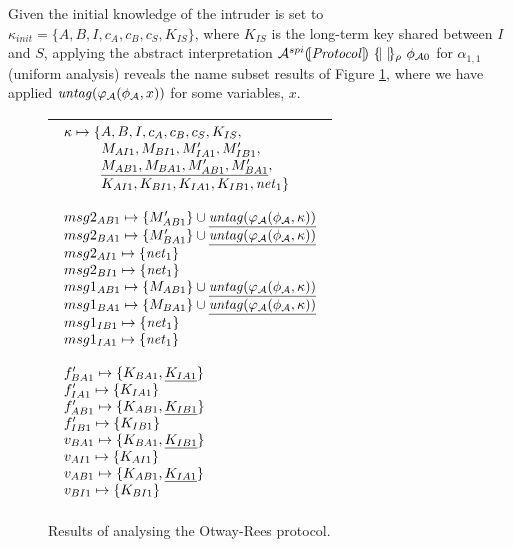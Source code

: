\documentclass[10pt,a4paper,final,oneside,fleqn]{book}
\begin{document}
Given the initial knowledge of the intruder is set to $\kappa_{init}=\{A,B,I,c_A,c_B,c_S,K_{IS}\}$, where $K_{IS}$ is the long-term key shared between $I$ and $S$, applying the abstract interpretation $\mathcal{A}^{spi}(\![\mbox{{\itshape Protocol\/}}]\!)~\{\!|~|\!\}_\rho~\phi_{\mathcal{A}0}$ for $\alpha_{1,1}$ (uniform analysis) reveals the name subset results of Figure \ref{anot}, where we have applied $\mbox{{\itshape untag\/}}(\varphi_\mathcal{A}(\phi_\mathcal{A},x))$ for some variables, $x$.
\begin{figure}[bht]
\begin{center}
\begin{tabular}{|l|}
\hline
$\begin{array}{l}
\kappa\mapsto\{A,B,I,c_A,c_B,c_S,K_{IS},\\
~~~~~~~~M_{AI1},M_{BI1},M'_{IA1},M'_{IB1},\\
~~~~~~~~\underline{M_{AB1},M_{BA1},M'_{AB1},M'_{BA1}},\\
~~~~~~~~K_{AI1},K_{BI1},K_{IA1},K_{IB1},\mbox{{\itshape net\/}}_1\}\\\\
msg2_{AB1}\mapsto\{M'_{AB1}\}\cup\underline{\mbox{{\itshape untag\/}}(\varphi_\mathcal{A}(\phi_\mathcal{A},\kappa))}\\
msg2_{BA1}\mapsto\{M'_{BA1}\}\cup\underline{\mbox{{\itshape untag\/}}(\varphi_\mathcal{A}(\phi_\mathcal{A},\kappa))}\\
msg2_{AI1}\mapsto\{\mbox{{\itshape net\/}}_1\}\\
msg2_{BI1}\mapsto\{\mbox{{\itshape net\/}}_1\}\\
msg1_{AB1}\mapsto\{M_{AB1}\}\cup\underline{\mbox{{\itshape untag\/}}(\varphi_\mathcal{A}(\phi_\mathcal{A},\kappa))}\\
msg1_{BA1}\mapsto\{M_{BA1}\}\cup\underline{\mbox{{\itshape untag\/}}(\varphi_\mathcal{A}(\phi_\mathcal{A},\kappa))}\\
msg1_{IB1}\mapsto\{\mbox{{\itshape net\/}}_1\}\\
msg1_{IA1}\mapsto\{\mbox{{\itshape net\/}}_1\}\\\\
f'_{BA1}\mapsto\{K_{BA1},\underline{K_{IA1}}\}\\
f'_{IA1}\mapsto\{K_{IA1}\}\\
f'_{AB1}\mapsto\{K_{AB1},\underline{K_{IB1}}\} \\
f'_{IB1}\mapsto\{K_{IB1}\}\\
v_{BA1}\mapsto\{K_{BA1},\underline{K_{IB1}}\}\\
v_{AI1}\mapsto\{K_{AI1}\}\\
v_{AB1}\mapsto\{K_{AB1},\underline{K_{IA1}}\}\\
v_{BI1}\mapsto\{K_{BI1}\}
\end{array}$\\
\hline
\end{tabular}
\end{center}
\caption{Results of analysing the Otway-Rees protocol.\label{anot}}
\end{figure}
\end{document}
